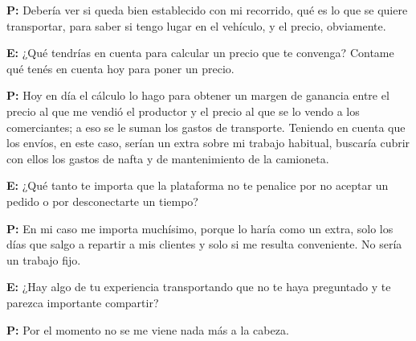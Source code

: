 {\noindent\textbf{P:} Debería ver si queda bien establecido con mi recorrido, qué es lo que se quiere transportar, para saber si tengo lugar en el vehículo, y el precio, obviamente.

\noindent\textbf{E:} ¿Qué tendrías en cuenta para calcular un precio que te convenga? Contame qué tenés en cuenta hoy para poner un precio.

\noindent\textbf{P:} Hoy en día el cálculo lo hago para obtener un margen de ganancia entre el precio al que me vendió el productor y el precio al que se lo vendo a los comerciantes; a eso se le suman los gastos de transporte. Teniendo en cuenta que los envíos, en este caso, serían un extra sobre mi trabajo habitual, buscaría cubrir con ellos los gastos de nafta y de mantenimiento de la camioneta.

\noindent\textbf{E:} ¿Qué tanto te importa que la plataforma no te penalice por no aceptar un pedido o por desconectarte un tiempo?

\noindent\textbf{P:} En mi caso me importa muchísimo, porque lo haría como un extra, solo los días que salgo a repartir a mis clientes y solo si me resulta conveniente. No sería un trabajo fijo.

\noindent\textbf{E:} ¿Hay algo de tu experiencia transportando que no te haya preguntado y te parezca importante compartir?

\noindent\textbf{P:} Por el momento no se me viene nada más a la cabeza.
}
